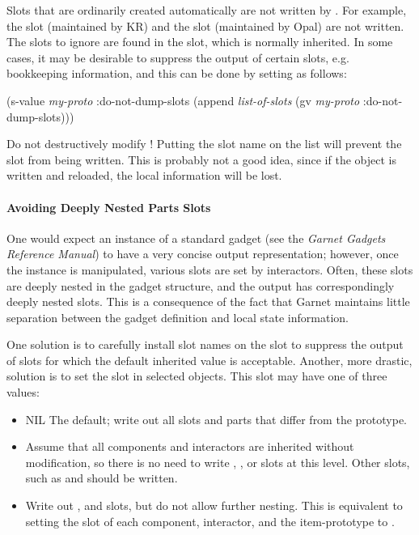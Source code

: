 Slots that are ordinarily created automatically are not written
by .  For example, the  slot
(maintained by KR) and the  slot (maintained
by Opal) are not written.  The slots to ignore are found in the
 slot, which is normally inherited.  In some
cases, it may be desirable to suppress the output of certain slots,
e.g. bookkeeping information, and this can be done by setting
 as follows:
\begin{programexample}
(s-value {\it my-proto}
         :do-not-dump-slots
         (append {\it list-of-slots} (gv {\it my-proto} :do-not-dump-slots)))
\end{programexample}
Do not destructively modify !  Putting
the slot name  on the list will prevent the
 slot from being written.  This is probably
not a good idea, since if the object is written and reloaded, the
local  information will be lost.

\paragraph{Avoiding Deeply Nested Parts Slots}
One would expect an instance of a standard gadget (see the {\it Garnet
Gadgets Reference Manual}) to have a very concise output representation;
however, once the instance is manipulated, various slots are set
by interactors.  Often, these slots are deeply nested in the gadget
structure, and the output has correspondingly deeply nested 
slots.  This is a consequence of the fact that Garnet maintains
little separation
between the gadget definition and local state information.

One solution is to carefully install slot names on the
 slot to suppress the output of slots for
which the default inherited value is acceptable.  Another, more
drastic, solution is to set the 
 slot
in selected objects.  This slot may have one of three values:
\begin{itemize}
\item NIL \value{shortdash} The default; write out all slots and parts
that differ from the prototype.

\item {} \value{shortdash} Assume that all components and
interactors are inherited without modification, so there is
no need to write , , or 
slots at this level.  Other slots, such as  and 
should be written.

\item {}
\value{shortdash} Write out , 
and  slots, but do not allow further nesting.  This
is equivalent to setting the  slot of each
component, interactor, and the item-prototype to .
\end{itemize}


